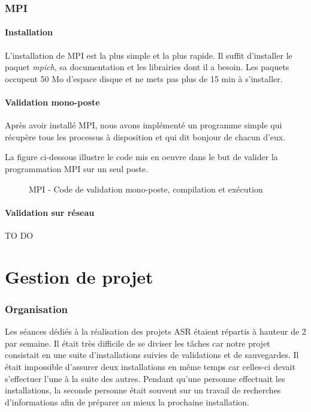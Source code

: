 \documentclass[final]{polytech/polytech}
\begin{document}
\section{MPI}

\subsection{Installation}
L'installation de MPI est la plus simple et la plus rapide. Il suffit d'installer le paquet \textit{mpich}, sa documentation et les librairies dont il a besoin. Les paquets occupent 50 Mo d'espace disque et ne mets pas plus de 15 min à s'installer.

\subsection{Validation mono-poste}
Après avoir installé MPI, nous avons implémenté un programme simple qui récupère tous les processus à disposition et qui dit bonjour de chacun d'eux.

La figure ci-dessous illustre le code mis en oeuvre dans le but de valider la programmation MPI sur un seul poste.

\begin{figure}
	\caption{MPI - Code de validation mono-poste, compilation et exécution}
	\label{fig:mpi_hello}
\end{figure}

\vfill\eject

\subsection{Validation sur réseau} %
TO DO

\part{Gestion de projet}

\section{Organisation}
Les séances dédiés à la réalisation des projets ASR étaient répartis à hauteur de 2 par semaine. Il était très difficile de se diviser les tâches car notre projet consistait en une suite d'installations suivies de validations et de sauvegardes. Il était impossible d'assurer deux installations en même temps car celles-ci devait s'effectuer l'une à la suite des autres. Pendant qu'une personne effectuait les installations, la seconde personne était souvent sur un travail de recherches d'informations afin de préparer au mieux la prochaine installation.
\end{document}
